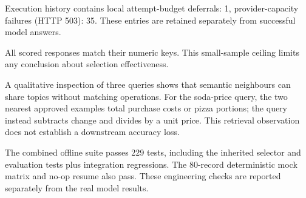 Execution history contains local attempt-budget deferrals: 1, provider-capacity failures (HTTP 503): 35. These entries are retained separately from successful model answers.

All scored responses match their numeric keys. This small-sample ceiling limits any conclusion about selection effectiveness.

A qualitative inspection of three queries shows that semantic neighbours can share topics without matching operations. For the soda-price query, the two nearest approved examples total purchase costs or pizza portions; the query instead subtracts change and divides by a unit price. This retrieval observation does not establish a downstream accuracy loss.

The combined offline suite passes 229 tests, including the inherited selector and evaluation tests plus integration regressions. The 80-record deterministic mock matrix and no-op resume also pass. These engineering checks are reported separately from the real model results.
